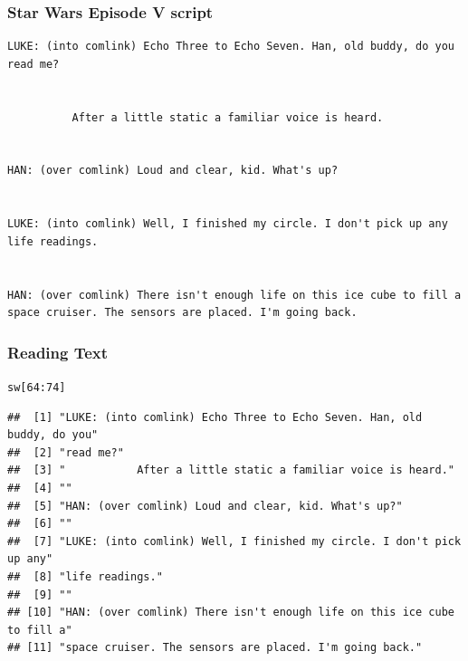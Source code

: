 \documentclass[12pt]{beamer}\usepackage[]{graphicx}\usepackage[]{color}
\makeatletter
\newcommand{\hlnum}[1]{\textcolor[rgb]{0.686,0.059,0.569}{#1}}%
\newcommand{\hlopt}[1]{\textcolor[rgb]{0,0,0}{#1}}%
\newcommand{\hlstd}[1]{\textcolor[rgb]{0.345,0.345,0.345}{#1}}%
\newenvironment{kframe}{%
 \def\at@end@of@kframe{}%
 \ifinner\ifhmode%
  \def\at@end@of@kframe{\end{minipage}}%
  \begin{minipage}{\columnwidth}%
 \fi\fi%
 \def\FrameCommand##1{\hskip\@totalleftmargin \hskip-\fboxsep
 \colorbox{shadecolor}{##1}\hskip-\fboxsep
     \hskip-\linewidth \hskip-\@totalleftmargin \hskip\columnwidth}%
 \MakeFramed {\advance\hsize-\width
   \@totalleftmargin\z@ \linewidth\hsize
   \@setminipage}}%
 {\par\unskip\endMakeFramed%
 \at@end@of@kframe}
\newenvironment{knitrout}{}{} %
\makeatother
\begin{document}

\begin{frame}[fragile]
\frametitle{Star Wars Episode V script}

{\scriptsize
\begin{verbatim}
LUKE: (into comlink) Echo Three to Echo Seven. Han, old buddy, do you
read me?


          After a little static a familiar voice is heard.


HAN: (over comlink) Loud and clear, kid. What's up?


LUKE: (into comlink) Well, I finished my circle. I don't pick up any 
life readings.


HAN: (over comlink) There isn't enough life on this ice cube to fill a 
space cruiser. The sensors are placed. I'm going back.
\end{verbatim}
}

\end{frame}


\begin{frame}[fragile]
\frametitle{Reading Text}

\begin{knitrout}\tiny
{}\color{fgcolor}\begin{kframe}
\begin{alltt}
\hlstd{sw[}\hlnum{64}\hlopt{:}\hlnum{74}\hlstd{]}
\end{alltt}
\begin{verbatim}
##  [1] "LUKE: (into comlink) Echo Three to Echo Seven. Han, old buddy, do you" 
##  [2] "read me?"                                                              
##  [3] "           After a little static a familiar voice is heard."           
##  [4] ""                                                                      
##  [5] "HAN: (over comlink) Loud and clear, kid. What's up?"                   
##  [6] ""                                                                      
##  [7] "LUKE: (into comlink) Well, I finished my circle. I don't pick up any"  
##  [8] "life readings."                                                        
##  [9] ""                                                                      
## [10] "HAN: (over comlink) There isn't enough life on this ice cube to fill a"
## [11] "space cruiser. The sensors are placed. I'm going back."
\end{verbatim}
\end{kframe}
\end{knitrout}

\end{frame}
\end{document}
